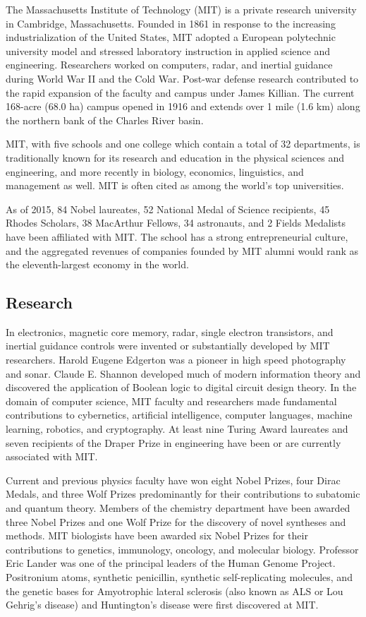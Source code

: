
The Massachusetts Institute of Technology (MIT) is a private research university in Cambridge, Massachusetts. Founded in 1861 in response to the increasing industrialization of the United States, MIT adopted a European polytechnic university model and stressed laboratory instruction in applied science and engineering. Researchers worked on computers, radar, and inertial guidance during World War II and the Cold War. Post-war defense research contributed to the rapid expansion of the faculty and campus under James Killian. The current 168-acre (68.0 ha) campus opened in 1916 and extends over 1 mile (1.6 km) along the northern bank of the Charles River basin.

MIT, with five schools and one college which contain a total of 32 departments, is traditionally known for its research and education in the physical sciences and engineering, and more recently in biology, economics, linguistics, and management as well. MIT is often cited as among the world's top universities.

As of 2015, 84 Nobel laureates, 52 National Medal of Science recipients, 45 Rhodes Scholars, 38 MacArthur Fellows, 34 astronauts, and 2 Fields Medalists have been affiliated with MIT. The school has a strong entrepreneurial culture, and the aggregated revenues of companies founded by MIT alumni would rank as the eleventh-largest economy in the world.

\subsection {Research}

In electronics, magnetic core memory, radar, single electron transistors, and inertial guidance controls were invented or substantially developed by MIT researchers. Harold Eugene Edgerton was a pioneer in high speed photography and sonar. Claude E. Shannon developed much of modern information theory and discovered the application of Boolean logic to digital circuit design theory. In the domain of computer science, MIT faculty and researchers made fundamental contributions to cybernetics, artificial intelligence, computer languages, machine learning, robotics, and cryptography. At least nine Turing Award laureates and seven recipients of the Draper Prize in engineering have been or are currently associated with MIT.

Current and previous physics faculty have won eight Nobel Prizes, four Dirac Medals, and three Wolf Prizes predominantly for their contributions to subatomic and quantum theory. Members of the chemistry department have been awarded three Nobel Prizes and one Wolf Prize for the discovery of novel syntheses and methods. MIT biologists have been awarded six Nobel Prizes for their contributions to genetics, immunology, oncology, and molecular biology. Professor Eric Lander was one of the principal leaders of the Human Genome Project. Positronium atoms, synthetic penicillin, synthetic self-replicating molecules, and the genetic bases for Amyotrophic lateral sclerosis (also known as ALS or Lou Gehrig's disease) and Huntington's disease were first discovered at MIT.

\pagebreak
